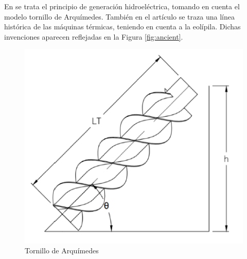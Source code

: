En \cite{cuenca2023diseno} se trata el principio de generación hidroeléctrica, tomando en cuenta el modelo tornillo de Arquímedes. También en el artículo \cite{giri2020maquinas} se traza una línea histórica de las máquinas térmicas, teniendo en cuenta a la eolípila. Dichas invenciones aparecen reflejadas en la Figura \ref{fig:ancient}.

\begin{figure}[ht!]
	\centering
	\begin{minipage}{0.3\linewidth}
		\centering
		\includegraphics[width=\linewidth]{figs/arquimedes.png}
		\caption*{\centering Tornillo de Arquímedes}  %
	\end{minipage}
	\hspace{3cm}
	\begin{minipage}{0.3\linewidth}
		\centering

\end{minipage}
\end{figure}
